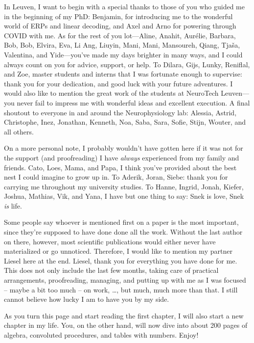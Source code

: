 In Leuven, I want to begin with a special thanks to those of you who
guided me in the beginning of my PhD: Benjamin, for introducing me to
the wonderful world of ERPs and linear decoding, and Axel and Arno for
powering through COVID with me. As for the rest of you lot—Aline,
Anahit, Aurélie, Barbara, Bob, Bob, Elvira, Eva, Li Ang, Liuyin, Mani,
Mani, Mansoureh, Qiang, Tjaša, Valentina, and Yide—you've made my days
brighter in many ways, and I could always count on you for advice,
support, or help. To Dilara, Gijs, Lunky, Reniflal, and Zoe, master
students and interns that I was fortunate enough to supervise: thank
you for your dedication, and good luck with your future adventures. I
would also like to mention the great work of the students at NeuroTech
Leuven—you never fail to impress me with wonderful ideas and excellent
execution. A final shoutout to everyone in and around the
Neurophysiology lab: Alessia, Astrid, Christophe, Inez, Jonathan,
Kenneth, Noa, Saba, Sara, Sofie, Stijn, Wouter, and all others.

On a more personal note, I probably wouldn't have gotten here if it was
not for the support (and proofreading) I have \emph{always} experienced
from my family and friends.
Cato, Loes, Mama, and Papa, I think you've provided about the
best nest I could imagine to grow up in. To Aderik, Joran, Siebe: thank you for
carrying me throughout my university studies.
To Hanne, Ingrid, Jonah, Kiefer, Joshua, Mathias, Vik, and Yana, I have but one
thing to say: Snek is love, Snek \emph{is} life.

Some people say whoever is mentioned first on a paper is the most
important, since they're supposed to have done done all the work.
Without the last author on there, however, most scientific publications would
either never have materialized or go unnoticed. Therefore, I would like to
mention my partner Liesel here at the end.
Liesel, thank you for everything you have done
for me. This does not only include the last few months, taking care of
practical arrangements, proofreading, managing, and putting up with me as I was
focused -- maybe a bit too much -- on work, \ldots, but much, much more than
that.
I still cannot believe how lucky I am to have you by my side.

As you turn this page and start reading the first chapter, I will also
start a new chapter in my life. You, on the other hand, will now dive
into about 200 pages of algebra, convoluted procedures, and tables with
numbers. Enjoy!
